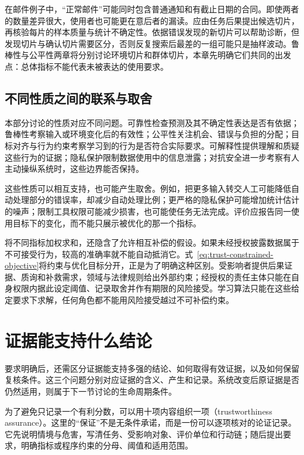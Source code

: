 在邮件例子中，“正常邮件”可能同时包含普通通知和有截止日期的合同。即使两者的数量差异很大，使用者也可能更在意后者的漏读。应由任务后果提出候选切片，再核验每片的样本质量与统计不确定性。依据错误发现的新切片可以帮助诊断，但发现切片与确认切片需要区分，否则反复搜索后最差的一组可能只是抽样波动。鲁棒性与公平性两章将分别讨论环境切片和群体切片，本章先明确它们共同的出发点：总体指标不能代表未被表达的使用要求。

\subsection{不同性质之间的联系与取舍}

本部分讨论的性质对应不同问题。可靠性检查预测及其不确定性表达是否有依据；鲁棒性考察输入或环境变化后的有效性；公平性关注机会、错误与负担的分配；目标对齐与行为约束考察学习到的行为是否符合实际要求。可解释性提供理解和质疑这些行为的证据；隐私保护限制数据使用中的信息泄露；对抗安全进一步考察有人主动操纵系统时，这些边界能否保持。

这些性质可以相互支持，也可能产生取舍。例如，把更多输入转交人工可能降低自动处理部分的错误率，却减少自动处理比例；更严格的隐私保护可能增加统计估计的噪声；限制工具权限可能减少损害，也可能使任务无法完成。评价应报告同一使用目标下的变化，而不能只展示被优化的那一个指标。

将不同指标加权求和，还隐含了允许相互补偿的假设。如果未经授权披露数据属于不可接受行为，较高的准确率就不能自动抵消它。式~\eqref{eq:trust-constrained-objective}将约束与优化目标分开，正是为了明确这种区别。受影响者提供后果证据、质询和补救需求，领域与法律规则给出外部约束；经授权的责任主体只能在自身权限内据此设定阈值、记录取舍并作有期限的风险接受。学习算法只能在这些给定要求下求解，任何角色都不能用风险接受越过不可补偿约束。

\section{证据能支持什么结论}
\label{sec:trust-evidence}

要求明确后，还需区分证据能支持多强的结论、如何取得有效证据，以及如何保留复核条件。这三个问题分别对应证据的含义、产生和记录。系统改变后原证据是否仍然适用，则属于下一节讨论的生命周期条件。

为了避免只记录一个有利分数，可以用十项内容组织一项（trustworthiness assurance）。这里的“保证”不是无条件承诺，而是一份可以逐项核对的论证记录。它先说明情境与危害，写清任务、受影响对象、评价单位和行动链；随后提出要求，明确指标或程序约束的分母、阈值和适用范围。

